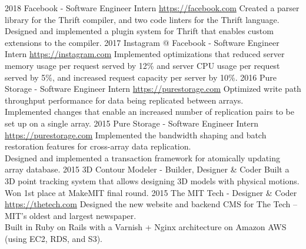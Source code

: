 \documentclass[]{friggeri-cv} %
\begin{document}
\begin{entrylist}
  \entry
  {2018}
  {Facebook - Software Engineer Intern}
  {\href{https://facebook.com}{https://facebook.com}}
  {Created a parser library for the Thrift compiler, and two code linters for the Thrift language. \\
  Designed and implemented a plugin system for Thrift that enables custom extensions to the compiler. }
  \entry
  {2017}
  {Instagram @ Facebook - Software Engineer Intern}
  {\href{https://instagram.com}{https://instagram.com}}
  {Implemented optimizations that reduced server memory usage per request served by 12\% and server CPU usage per request served by 5\%, and increased request capacity per server by 10\%. }
  \entry
  {2016}
  {Pure Storage - Software Engineer Intern}
  {\href{https://purestorage.com}{https://purestorage.com}}
  {Optimized write path throughput performance for data being replicated between arrays. \\
  Implemented changes that enable an increased number of replication pairs to be set up on a single array. }
  \entry
  {2015}
  {Pure Storage - Software Engineer Intern}
  {\href{https://purestorage.com}{https://purestorage.com}}
  {Implemented the bandwidth shaping and batch restoration features for cross-array data replication. \\
  Designed and implemented a transaction framework for atomically updating array database. }
  \entry
  {2015}
  {3D Contour Modeler - Builder, Designer \& Coder}
  {}
  {Built a 3D point tracking system that allows designing 3D models with physical motions. \\
  Won 1st place at MakeMIT final round. }
  \entry
  {2015}
  {The MIT Tech - Designer \& Coder}
  {\href{https://thetech.com}{https://thetech.com}}
  {Designed the new website and backend CMS for The Tech -- MIT's oldest and largest newspaper. \\
  Built in Ruby on Rails with a Varnish + Nginx architecture on Amazon AWS (using EC2, RDS, and S3). }

\end{entrylist}
\end{document}
